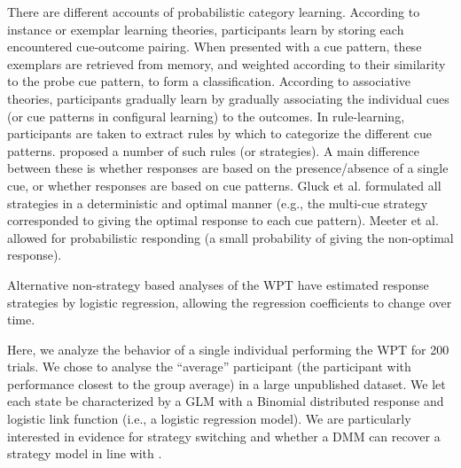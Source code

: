 \documentclass[a4paper,12pt,man,english]{apa} %
\begin{document}
\nocite{Knowlton1994}


There are different accounts of probabilistic category learning.
According to instance or exemplar learning theories, participants
learn by storing each encountered cue-outcome pairing.  When presented
with a cue pattern, these exemplars are retrieved from memory, and
weighted according to their similarity to the probe cue pattern, to
form a classification.  According to associative theories,
participants gradually learn by gradually associating the individual
cues (or cue patterns in configural learning) to the outcomes.  In
rule-learning, participants are taken to extract rules by which to
categorize the different cue patterns.  \cite{Gluck2002} proposed a
number of such rules (or strategies).  A main difference between these
is whether responses are based on the presence/absence of a single
cue, or whether responses are based on cue patterns.  Gluck et al.
formulated all strategies in a deterministic and optimal manner (e.g.,
the multi-cue strategy corresponded to giving the optimal response to
each cue pattern).  Meeter et al.  allowed for probabilistic
responding (a small probability of giving the non-optimal response).

Alternative non-strategy based analyses of the WPT
\cite{Lagnado2006,Speekenbrink2008} have estimated response strategies by
logistic regression, allowing the regression coefficients to change
over time.

Here, we analyze the behavior of a single individual performing the
WPT for 200 trials.  We chose to analyse the ``average'' participant
(the participant with performance closest to the group average) in a
large unpublished dataset.  We let each state be characterized by a
GLM with a Binomial distributed response and logistic link function
(i.e., a logistic regression model).  We are particularly interested
in evidence for strategy switching and whether a DMM can recover a
strategy model in line with .
\end{document}
